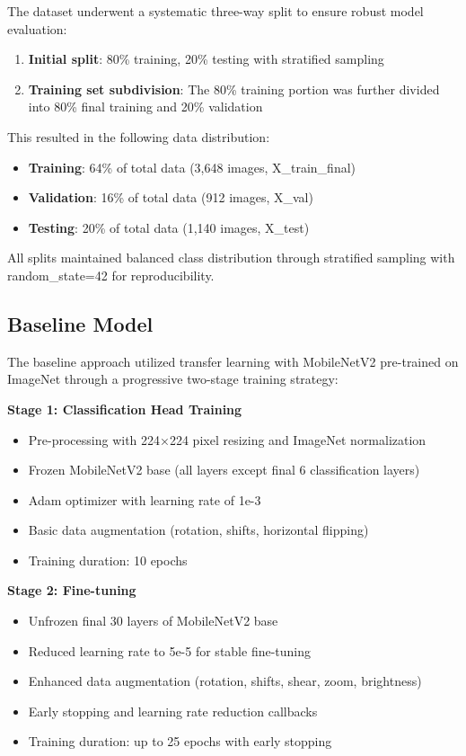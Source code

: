 \documentclass{article}
\begin{document}
The dataset underwent a systematic three-way split to ensure robust model evaluation:

\begin{enumerate}
    \item \textbf{Initial split}: 80\% training, 20\% testing with stratified sampling
    \item \textbf{Training set subdivision}: The 80\% training portion was further divided into 80\% final training and 20\% validation
\end{enumerate}

This resulted in the following data distribution:
\begin{itemize}
    \item \textbf{Training}: 64\% of total data (3,648 images, X\_train\_final)
    \item \textbf{Validation}: 16\% of total data (912 images, X\_val)  
    \item \textbf{Testing}: 20\% of total data (1,140 images, X\_test)
\end{itemize}

All splits maintained balanced class distribution through stratified sampling with random\_state=42 for reproducibility.

\subsection{Baseline Model}

The baseline approach utilized transfer learning with MobileNetV2 pre-trained on ImageNet through a progressive two-stage training strategy:

\textbf{Stage 1: Classification Head Training}
\begin{itemize}
    \item Pre-processing with 224×224 pixel resizing and ImageNet normalization
    \item Frozen MobileNetV2 base (all layers except final 6 classification layers)
    \item Adam optimizer with learning rate of 1e-3
    \item Basic data augmentation (rotation, shifts, horizontal flipping)
    \item Training duration: 10 epochs
\end{itemize}

\textbf{Stage 2: Fine-tuning}
\begin{itemize}
    \item Unfrozen final 30 layers of MobileNetV2 base
    \item Reduced learning rate to 5e-5 for stable fine-tuning
    \item Enhanced data augmentation (rotation, shifts, shear, zoom, brightness)
    \item Early stopping and learning rate reduction callbacks
    \item Training duration: up to 25 epochs with early stopping
\end{itemize}
\end{document}
